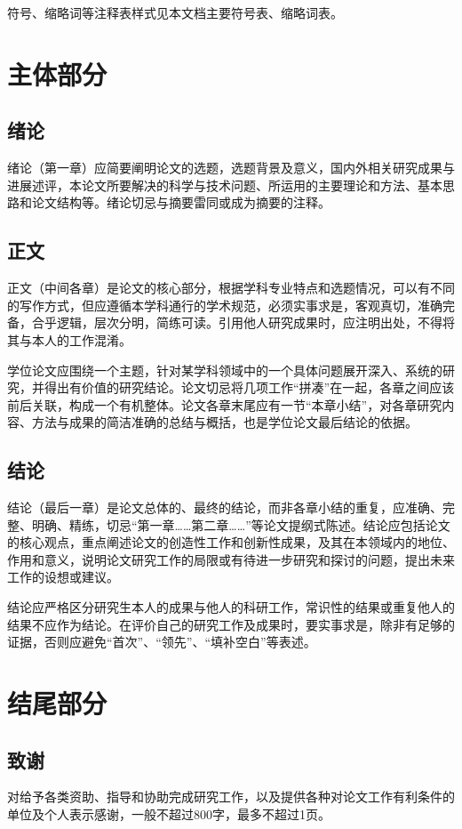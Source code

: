 符号、缩略词等注释表样式见本文档主要符号表、缩略词表。

\section{主体部分}
\subsection{绪论}
绪论（第一章）应简要阐明论文的选题，选题背景及意义，国内外相关研究成果与进展述评，本论文所要解决的科学与技术问题、所运用的主要理论和方法、基本思路和论文结构等。绪论切忌与摘要雷同或成为摘要的注释。

\subsection{正文}
正文（中间各章）是论文的核心部分，根据学科专业特点和选题情况，可以有不同的写作方式，但应遵循本学科通行的学术规范，必须实事求是，客观真切，准确完备，合乎逻辑，层次分明，简练可读。引用他人研究成果时，应注明出处，不得将其与本人的工作混淆。


学位论文应围绕一个主题，针对某学科领域中的一个具体问题展开深入、系统的研究，并得出有价值的研究结论。论文切忌将几项工作“拼凑”在一起，各章之间应该前后关联，构成一个有机整体。论文各章末尾应有一节“本章小结”，对各章研究内容、方法与成果的简洁准确的总结与概括，也是学位论文最后结论的依据。

\subsection{结论}
结论（最后一章）是论文总体的、最终的结论，而非各章小结的重复，应准确、完整、明确、精练，切忌“第一章……第二章……”等论文提纲式陈述。结论应包括论文的核心观点，重点阐述论文的创造性工作和创新性成果，及其在本领域内的地位、作用和意义，说明论文研究工作的局限或有待进一步研究和探讨的问题，提出未来工作的设想或建议。

结论应严格区分研究生本人的成果与他人的科研工作，常识性的结果或重复他人的结果不应作为结论。在评价自己的研究工作及成果时，要实事求是，除非有足够的证据，否则应避免“首次”、“领先”、“填补空白”等表述。

\section{结尾部分}
\subsection{致谢}
对给予各类资助、指导和协助完成研究工作，以及提供各种对论文工作有利条件的单位及个人表示感谢，一般不超过800字，最多不超过1页。
